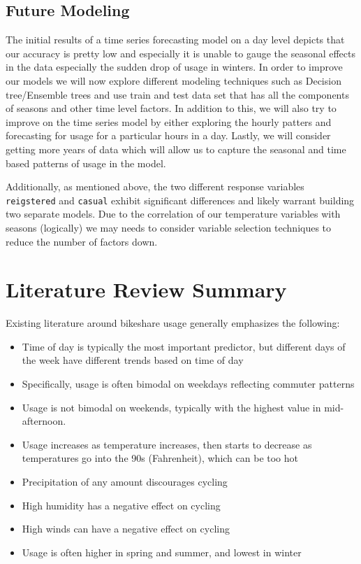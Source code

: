 \documentclass[
]{article}
\providecommand{\tightlist}{%
  \setlength{\itemsep}{0pt}\setlength{\parskip}{0pt}}
\begin{document}
\hypertarget{future-modeling}{%
\subsection{Future Modeling}\label{future-modeling}}

The initial results of a time series forecasting model on a day level
depicts that our accuracy is pretty low and especially it is unable to
gauge the seasonal effects in the data especially the sudden drop of
usage in winters. In order to improve our models we will now explore
different modeling techniques such as Decision tree/Ensemble trees and
use train and test data set that has all the components of seasons and
other time level factors. In addition to this, we will also try to
improve on the time series model by either exploring the hourly patters
and forecasting for usage for a particular hours in a day. Lastly, we
will consider getting more years of data which will allow us to capture
the seasonal and time based patterns of usage in the model.

Additionally, as mentioned above, the two different response variables
\texttt{reigstered} and \texttt{casual} exhibit significant differences
and likely warrant building two separate models. Due to the correlation
of our temperature variables with seasons (logically) we may needs to
consider variable selection techniques to reduce the number of factors
down.

\hypertarget{literature-review-summary}{%
\section{Literature Review Summary}\label{literature-review-summary}}

Existing literature around bikeshare usage generally emphasizes the
following:

\begin{itemize}
\tightlist
\item
  Time of day is typically the most important predictor, but different
  days of the week have different trends based on time of day
\item
  Specifically, usage is often bimodal on weekdays reflecting commuter
  patterns
\item
  Usage is not bimodal on weekends, typically with the highest value in
  mid-afternoon.
\item
  Usage increases as temperature increases, then starts to decrease as
  temperatures go into the 90s (Fahrenheit), which can be too hot
\item
  Precipitation of any amount discourages cycling
\item
  High humidity has a negative effect on cycling
\item
  High winds can have a negative effect on cycling
\item
  Usage is often higher in spring and summer, and lowest in winter
\end{itemize}
\end{document}
